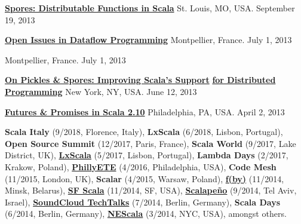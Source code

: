 \documentclass[9pt]{article}
\begin{document}
\noindent\href{https://speakerdeck.com/heathermiller/spores-distributable-functions-in-scala}{\bf Spores: Distributable Functions in Scala} 
\linebreak\noindent St. Louis, MO, USA. September 19, 2013
\bigskip

\noindent\href{http://heather.miller.am/files/LaME2013-Dataflow.pdf}{\bf Open Issues in Dataflow Programming} 
\linebreak\noindent Montpellier, France. July 1, 2013
\bigskip

 
\linebreak\noindent Montpellier, France. July 1, 2013
\bigskip

\noindent\href{https://speakerdeck.com/heathermiller/on-pickles-and-spores-improving-support-for-distributed-programming-in-scala}{\bf On Pickles \& Spores: Improving Scala's Support} \vspace{-0.03in}
\linebreak\noindent\href{https://speakerdeck.com/heathermiller/on-pickles-and-spores-improving-support-for-distributed-programming-in-scala}{\bf for Distributed Programming}\dates{}
\linebreak\noindent New York, NY, USA. June 12, 2013
\bigskip

\noindent\href{http://lampwww.epfl.ch/~hmiller/files/Futures-Try-PhillyETE.pdf}{\bf Futures \& Promises in Scala 2.10} 
\linebreak\noindent Philadelphia, PA, USA. April 2, 2013
\bigskip

{}
\medskip
\newline\noindent
{\bf Scala Italy} (9/2018, Florence, Italy),
{\bf LxScala} (6/2018, Lisbon, Portugal),
{\bf Open Source Summit} (12/2017, Paris, France),
{\bf Scala World} (9/2017, Lake District, UK),
{\bf \href{https://youtu.be/17yy5BwIiTw}{LxScala}} (5/2017, Lisbon, Portugal),
{\bf Lambda Days} (2/2017, Krakow, Poland),
{\bf\href{https://www.youtube.com/watch?v=67UNErFdr64}{PhillyETE}} (4/2016, Philadelphia, USA),
{\bf Code Mesh} (11/2015, London, UK),
{\bf Scalar} (4/2015, Warsaw, Poland),
{\bf\href{http://fby.by/}{f(by)}} (11/2014, Minsk, Belarus),
{\bf\href{https://www.youtube.com/watch?v=4obTnLVXQWY}{SF Scala}} (11/2014, SF, USA),
{\bf\href{http://www.scalapeno.org.il/#!heather-miller/cj0q}{Scalape\~{n}o}} (9/2014, Tel Aviv, Israel),
{\bf \href{https://www.eventbrite.com/e/soundcloud-techtalks-unconventional-thinking-in-design-and-programming-tickets-12166429117}{SoundCloud TechTalks}} (7/2014, Berlin, Germany),
{\bf Scala Days} (6/2014, Berlin, Germany),
{\bf\href{http://www.nescala.org/2014}{NEScala}} (3/2014, NYC, USA), amongst others.
\end{document}
